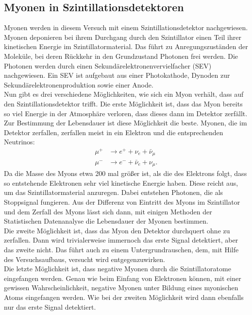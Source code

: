 \documentclass[
  bibliography=totoc,     %
  captions=tableheading,  %
  titlepage=firstiscover, %
]{scrartcl}
\begin{document}
  \subsection{Myonen in Szintillationsdetektoren}
  Myonen werden in diesem Versuch mit einem Szintillationsdetektor nachgewiesen.
  Myonen deponieren bei ihrem Durchgang durch den Szintillator einen Teil ihrer
  kinetischen Energie im Szintillatormaterial.
  Das führt zu Anregungszuständen der Moleküle, bei deren Rückkehr in
  den Grundzustand Photonen frei werden. Die Photonen werden durch einen
  Sekundärelektronenvervielfacher (SEV) nachgewiesen. Ein SEV ist aufgebaut aus
  einer Photokathode, Dynoden zur Sekundärelektronenproduktion sowie
  einer Anode.\\
  Nun gibt es drei verschiedene Möglichkeiten, wie sich ein Myon verhält, dass
  auf den Szintillationsdetektor trifft.
    Die erste Möglichkeit ist, dass das Myon bereits so viel Energie in der Atmosphäre
    verloren, dass dieses dann im Detektor zerfällt. Zur Bestimmung der
    Lebensdauer ist diese Möglichkeit die beste. Myonen, die im Detektor
    zerfallen, zerfallen meist in ein Elektron und die entsprechenden Neutrinos:
    \begin{align*}
      \mu^+ &\to e^+ + \nu_{e} + \bar{\nu}_{\mu}\\
      \mu^- &\to e^- + \bar{\nu}_{e} +  \nu_{\mu}.
    \end{align*}
    Da die Masse des Myons etwa 200 mal größer ist, als die des Elektrons folgt,
    dass so entstehende Elektronen sehr viel kinetische Energie haben. Diese
    reicht aus, um das Szintillatormaterial anzuregen. Dabei entstehen Photonen,
    die als Stoppsignal fungieren. Aus der Differenz von Eintritt des Myons im
    Szintillator und dem Zerfall des Myons lässt sich dann, mit einigen Methoden
    der Statistischen Datenanalyse die Lebensdauer der Myonen bestimmen.\\
    Die zweite Möglichkeit ist, dass das Myon den Detektor durchquert ohne zu
    zerfallen. Dann wird trivialerweise immernoch das erste Signal detektiert,
    aber das zweite nicht. Das führt auch zu einem Untergrundrauschen, dem, mit
    Hilfe des Versuchsaufbaus, versucht wird entgegenzuwirken.\\
    Die letzte Möglichkeit ist, dass negative Myonen durch die Szintillatoratome
    eingefangen werden. Genau wie beim Einfang von Elektronen können, mit einer
    gewissen Wahrscheinlichkeit, negative Myonen unter Bildung eines myonischen
    Atoms eingefangen werden. Wie bei der zweiten Möglichkeit wird dann ebenfalls
    nur das erste Signal detektiert.
\end{document}
